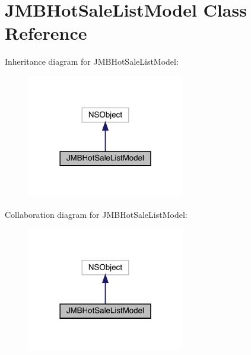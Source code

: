 \hypertarget{interface_j_m_b_hot_sale_list_model}{}\section{J\+M\+B\+Hot\+Sale\+List\+Model Class Reference}
\label{interface_j_m_b_hot_sale_list_model}


Inheritance diagram for J\+M\+B\+Hot\+Sale\+List\+Model\+:\nopagebreak
\begin{figure}[H]
\begin{center}
\leavevmode
\includegraphics[width=194pt]{interface_j_m_b_hot_sale_list_model__inherit__graph}
\end{center}
\end{figure}


Collaboration diagram for J\+M\+B\+Hot\+Sale\+List\+Model\+:\nopagebreak
\begin{figure}[H]
\begin{center}
\leavevmode
\includegraphics[width=194pt]{interface_j_m_b_hot_sale_list_model__coll__graph}
\end{center}
\end{figure}
